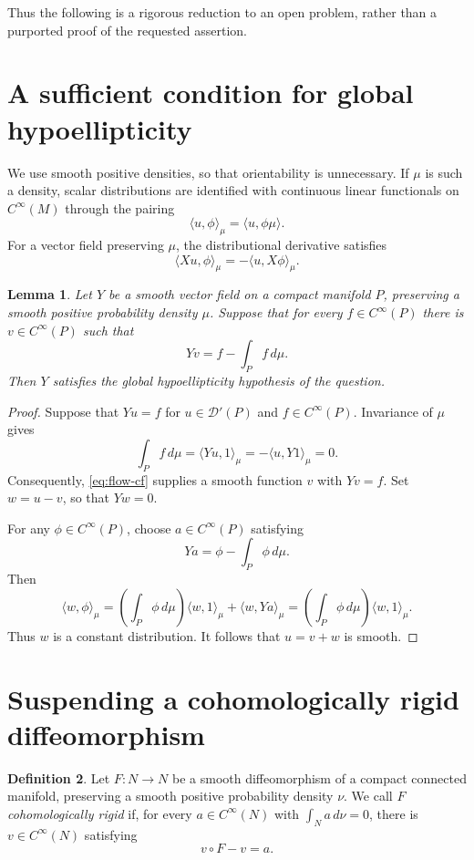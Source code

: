 \documentclass[11pt]{article}
\newtheorem{lemma}{Lemma}
\theoremstyle{definition}
\newtheorem{definition}[lemma]{Definition}
\theoremstyle{remark}
\newcommand{\Dprime}{\mathcal{D}'}
\begin{document}
Thus the following is a rigorous reduction to an open problem, rather
than a purported proof of the requested assertion.

\section{A sufficient condition for global hypoellipticity}

We use smooth positive densities, so that orientability is unnecessary.
If $\mu$ is such a density, scalar distributions are identified with
continuous linear functionals on $C^\infty(M)$ through the pairing
\[
 \langle u,\phi\rangle_\mu
 =
 \langle u,\phi\mu\rangle.
\]
For a vector field preserving $\mu$, the distributional derivative
satisfies
\[
 \langle Xu,\phi\rangle_\mu
 =
 -\langle u,X\phi\rangle_\mu.
\]

\begin{lemma}\label{lem:cf-gh}
Let $Y$ be a smooth vector field on a compact manifold $P$, preserving
a smooth positive probability density $\mu$. Suppose that for every
$f\in C^\infty(P)$ there is $v\in C^\infty(P)$ such that
\begin{equation}\label{eq:flow-cf}
 Yv=f-\int_P f\,d\mu.
\end{equation}
Then $Y$ satisfies the global hypoellipticity hypothesis of the question.
\end{lemma}

\begin{proof}
Suppose that $Yu=f$ for $u\in\Dprime(P)$ and $f\in C^\infty(P)$.
Invariance of $\mu$ gives
\[
 \int_P f\,d\mu
 =
 \langle Yu,1\rangle_\mu
 =
 -\langle u,Y1\rangle_\mu
 =
 0.
\]
Consequently, \eqref{eq:flow-cf} supplies a smooth function $v$ with
$Yv=f$. Set $w=u-v$, so that $Yw=0$.

For any $\phi\in C^\infty(P)$, choose $a\in C^\infty(P)$ satisfying
\[
 Ya=\phi-\int_P\phi\,d\mu.
\]
Then
\[
 \langle w,\phi\rangle_\mu
 =
 \left(\int_P\phi\,d\mu\right)\langle w,1\rangle_\mu
 +\langle w,Ya\rangle_\mu
 =
 \left(\int_P\phi\,d\mu\right)\langle w,1\rangle_\mu.
\]
Thus $w$ is a constant distribution. It follows that $u=v+w$ is smooth.
\end{proof}

\section{Suspending a cohomologically rigid diffeomorphism}

\begin{definition}
Let $F:N\to N$ be a smooth diffeomorphism of a compact connected
manifold, preserving a smooth positive probability density $\nu$.
We call $F$ \emph{cohomologically rigid} if, for every
$a\in C^\infty(N)$ with $\int_N a\,d\nu=0$, there is
$v\in C^\infty(N)$ satisfying
\begin{equation}\label{eq:map-cf}
 v\circ F-v=a.
\end{equation}
\end{definition}
\end{document}

